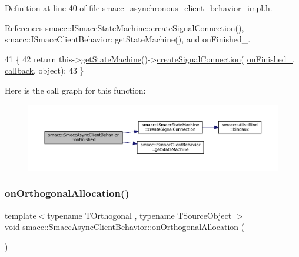 Definition at line 40 of file smacc\+\_\+asynchronous\+\_\+client\+\_\+behavior\+\_\+impl.\+h.



References smacc\+::\+I\+Smacc\+State\+Machine\+::create\+Signal\+Connection(), smacc\+::\+I\+Smacc\+Client\+Behavior\+::get\+State\+Machine(), and on\+Finished\+\_\+.


\begin{DoxyCode}
41     \{
42         \textcolor{keywordflow}{return} this->\hyperlink{classsmacc_1_1ISmaccClientBehavior_a9d55a85bf0a920033805a3c050de2019}{getStateMachine}()->\hyperlink{classsmacc_1_1ISmaccStateMachine_adf0f42ade0c65cc471960fe2a7c42da2}{createSignalConnection}(
      \hyperlink{classsmacc_1_1SmaccAsyncClientBehavior_a3b4f8bbacabffb8a37934407bc79ed80}{onFinished\_}, \hyperlink{sm__ridgeback__barrel__search__1_2servers_2opencv__perception__node_2opencv__perception__node_8cpp_a050e697bd654facce10ea3f6549669b3}{callback}, \textcolor{keywordtype}{object});
43     \}
\end{DoxyCode}
Here is the call graph for this function\+:
\nopagebreak
\begin{figure}[H]
\begin{center}
\leavevmode
\includegraphics[width=350pt]{classsmacc_1_1SmaccAsyncClientBehavior_aae9e2dd0d8e3ff25503f0908f040a221_cgraph}
\end{center}
\end{figure}
\mbox{\label{classsmacc_1_1SmaccAsyncClientBehavior_a85bf707ed4fc349e0e35d89c9e78bc54}} 
\subsubsection{\texorpdfstring{on\+Orthogonal\+Allocation()}{onOrthogonalAllocation()}}
{\footnotesize\ttfamily template$<$typename T\+Orthogonal , typename T\+Source\+Object $>$ \\
void smacc\+::\+Smacc\+Async\+Client\+Behavior\+::on\+Orthogonal\+Allocation (\begin{DoxyParamCaption}{ }\end{DoxyParamCaption})}



